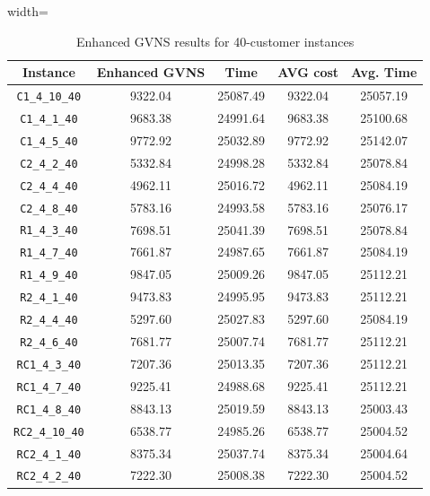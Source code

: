 \documentclass{article}
\begin{document}
\begin{table}[h]
\centering
\small
\setlength{\tabcolsep}{4pt}
\caption{Enhanced GVNS results for 40-customer instances}
\vspace{4mm}
\begin{adjustbox}{width=\textwidth}
\begin{tabular}{c c c c c}
\toprule
Instance & Enhanced GVNS & Time & AVG cost & Avg. Time \\
\midrule
\texttt{C1\_4\_10\_40} & 9322.04 & 25087.49 & 9322.04 & 25057.19 \\
\texttt{C1\_4\_1\_40} & 9683.38 & 24991.64 & 9683.38 & 25100.68 \\
\texttt{C1\_4\_5\_40} & 9772.92 & 25032.89 & 9772.92 & 25142.07 \\
\texttt{C2\_4\_2\_40} & 5332.84 & 24998.28 & 5332.84 & 25078.84 \\
\texttt{C2\_4\_4\_40} & 4962.11 & 25016.72 & 4962.11 & 25084.19 \\
\texttt{C2\_4\_8\_40} & 5783.16 & 24993.58 & 5783.16 & 25076.17 \\
\texttt{R1\_4\_3\_40} & 7698.51 & 25041.39 & 7698.51 & 25078.84 \\
\texttt{R1\_4\_7\_40} & 7661.87 & 24987.65 & 7661.87 & 25084.19 \\
\texttt{R1\_4\_9\_40} & 9847.05 & 25009.26 & 9847.05 & 25112.21 \\
\texttt{R2\_4\_1\_40} & 9473.83 & 24995.95 & 9473.83 & 25112.21 \\
\texttt{R2\_4\_4\_40} & 5297.60 & 25027.83 & 5297.60 & 25084.19 \\
\texttt{R2\_4\_6\_40} & 7681.77 & 25007.74 & 7681.77 & 25112.21 \\
\texttt{RC1\_4\_3\_40} & 7207.36 & 25013.35 & 7207.36 & 25112.21 \\
\texttt{RC1\_4\_7\_40} & 9225.41 & 24988.68 & 9225.41 & 25112.21 \\
\texttt{RC1\_4\_8\_40} & 8843.13 & 25019.59 & 8843.13 & 25003.43 \\
\texttt{RC2\_4\_10\_40} & 6538.77 & 24985.26 & 6538.77 & 25004.52 \\
\texttt{RC2\_4\_1\_40} & 8375.34 & 25037.74 & 8375.34 & 25004.64 \\
\texttt{RC2\_4\_2\_40} & 7222.30 & 25008.38 & 7222.30 & 25004.52 \\
\bottomrule
\end{tabular}
\end{adjustbox}
\end{table}
\end{document}
